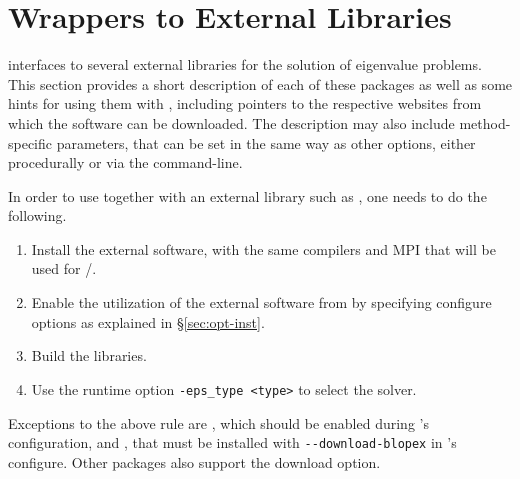 \section{Wrappers to External Libraries}
\label{sec:wrap}

\slepc interfaces to several external libraries for the solution of eigenvalue problems. This section provides a short description of each of these packages as well as some hints for using them with \slepc, including pointers to the respective websites from which the software can be downloaded. The description may also include method-specific parameters, that can be set in the same way as other \slepc options, either procedurally or via the command-line.

In order to use \slepc together with an external library such as \arpack, one needs to do the following.
\begin{enumerate}
\item Install the external software, with the same compilers and MPI that will be used for \petsc/\slepc.
\item Enable the utilization of the external software from \slepc by specifying configure options as explained in \S\ref{sec:opt-inst}.
 \item Build the \slepc libraries.
\item Use the runtime option \Verb!-eps_type <type>! to select the solver.
\end{enumerate}

Exceptions to the above rule are \lapack, which should be enabled during \petsc's configuration, and \blopex, that must be installed with \Verb!--download-blopex! in \slepc's configure. Other packages also support the download option.

